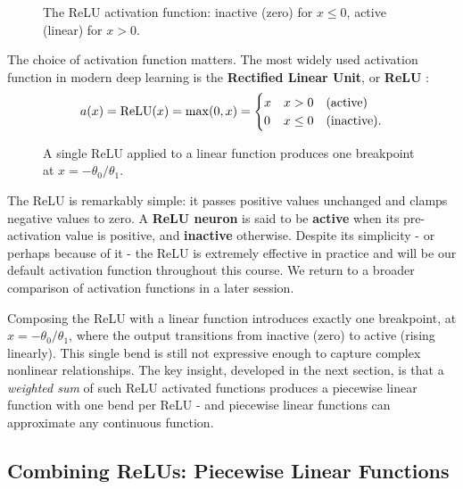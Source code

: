 \begin{figure}
 \centering
 \resizebox{0.25\textwidth}{!}{}
 \caption{The ReLU activation function: inactive (zero) for $x \leq 0$, active (linear) for $x > 0$.}
 \label{fig:relu}
\end{figure}
The choice of activation function matters. The most widely used activation function in modern deep learning is the \textbf{Rectified Linear Unit}, or \textbf{ReLU} \parencite{nair2010relu, glorot2011relu}:
\begin{equation}
 a(x) = \text{ReLU}(x) = \max(0, x) = \begin{cases} x & x > 0 \quad \text{(active)} \\ 0 & x \leq 0 \quad \text{(inactive).} \end{cases}
\end{equation}
\begin{figure}
 \centering
 \resizebox{0.25\textwidth}{!}{}
 \caption{A single ReLU applied to a linear function produces one breakpoint at $x = -\theta_0 / \theta_1$.}
 \label{fig:relu_single}
\end{figure}
The ReLU is remarkably simple: it passes positive values unchanged and clamps negative values to zero. A \textbf{ReLU neuron} is said to be \textbf{active} when its pre-activation value is positive, and \textbf{inactive} otherwise. Despite its simplicity - or perhaps because of it - the ReLU is extremely effective in practice and will be our default activation function throughout this course. We return to a broader comparison of activation functions in a later session.

Composing the ReLU with a linear function introduces exactly one breakpoint, at $x = -\theta_0 / \theta_1$, where the output transitions from inactive (zero) to active (rising linearly). This single bend is still not expressive enough to capture complex nonlinear relationships. The key insight, developed in the next section, is that a \textit{weighted sum} of such ReLU activated functions produces a piecewise linear function with one bend per ReLU - and piecewise linear functions can approximate any continuous function.

\subsection{Combining ReLUs: Piecewise Linear Functions}

